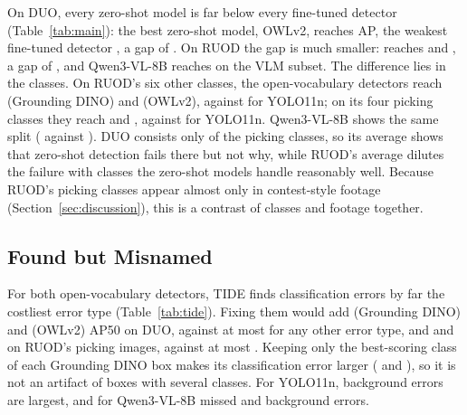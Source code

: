 \documentclass[letterpaper]{article} %
\begin{document}
On DUO, every zero-shot model is far below every fine-tuned detector (Table~\ref{tab:main}): the best zero-shot model, OWLv2, reaches \apOWL{} AP, the weakest fine-tuned detector \apYoloEightN, a gap of \dGap{} \dciGap. On RUOD the gap is much smaller: \rGapWeakest{} reaches \rApWeakest{} and \rGapBest{} \rApGD, a gap of \rdGap{} \rdciGap, and Qwen3-VL-8B reaches \rApQwenVL{} on the VLM subset. The difference lies in the classes. On RUOD's six other classes, the open-vocabulary detectors reach \rOthGD{} \rOthciGD{} (Grounding DINO) and \rOthOWL{} \rOthciOWL{} (OWLv2), against \rOthYoloN{} for YOLO11n; on its four picking classes they reach \rSeaGD{} \rSeaciGD{} and \rSeaOWL{} \rSeaciOWL, against \rSeaYoloN{} for YOLO11n. Qwen3-VL-8B shows the same split (\rOthQwenVL{} against \rSeaQwenVL). DUO consists only of the picking classes, so its average shows that zero-shot detection fails there but not why, while RUOD's average dilutes the failure with classes the zero-shot models handle reasonably well. Because RUOD's picking classes appear almost only in contest-style footage (Section~\ref{sec:discussion}), this is a contrast of classes and footage together.

\subsection{Found but Misnamed}
\label{sec:where}



For both open-vocabulary detectors, TIDE finds classification errors by far the costliest error type (Table~\ref{tab:tide}). Fixing them would add \tideClsDuoGD{} (Grounding DINO) and \tideClsDuoOWL{} (OWLv2) AP50 on DUO, against at most \tideOtherMaxDuoOWL{} for any other error type, and \tideClsRuodGD{} and \tideClsRuodOWL{} on RUOD's picking images, against at most \tideOtherMaxRuodOWL. Keeping only the best-scoring class of each Grounding DINO box makes its classification error larger (\tideClsDuoGDone{} and \tideClsRuodGDone), so it is not an artifact of boxes with several classes. For YOLO11n, background errors are largest, and for Qwen3-VL-8B missed and background errors.


\end{document}
